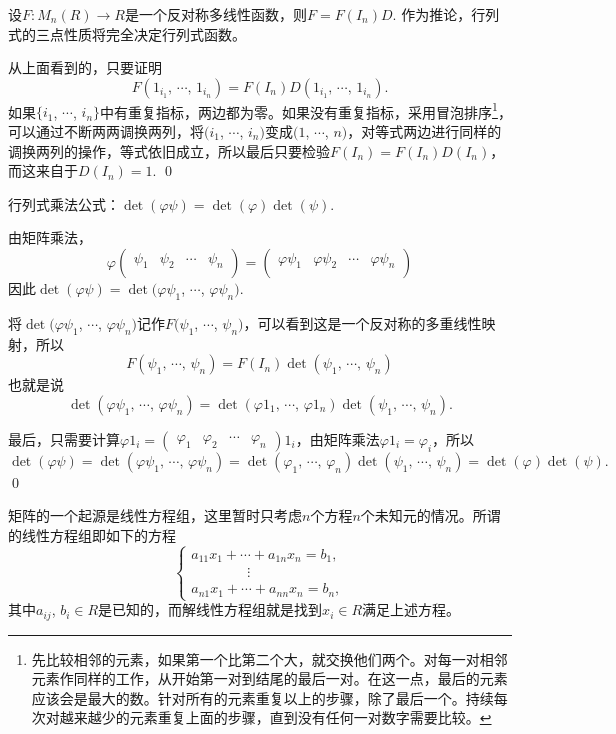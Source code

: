 \pro 设$F:M_n(R)\to R$是一个反对称多线性函数，则$F=F(I_n)D$. 作为推论，行列式的三点性质将完全决定行列式函数。

\proof 
	从上面看到的，只要证明
	\[
		F(1_{i_1},\,\cdots\!,\,1_{i_n})=F(I_n)D(1_{i_1},\,\cdots\!,\,1_{i_n}).
	\]
	如果$\{i_1$, $\cdots$, $i_n\}$中有重复指标，两边都为零。如果没有重复指标，采用冒泡排序\footnote{先比较相邻的元素，如果第一个比第二个大，就交换他们两个。对每一对相邻元素作同样的工作，从开始第一对到结尾的最后一对。在这一点，最后的元素应该会是最大的数。针对所有的元素重复以上的步骤，除了最后一个。持续每次对越来越少的元素重复上面的步骤，直到没有任何一对数字需要比较。}，可以通过不断两两调换两列，将$(i_1$, $\cdots$, $i_n)$变成$(1$, $\cdots$, $n)$，对等式两边进行同样的调换两列的操作，等式依旧成立，所以最后只要检验$F(I_n)=F(I_n)D(I_n)$，而这来自于$D(I_n)=1$.
\qed

\pro 行列式乘法公式：$\det(\varphi \psi)=\det(\varphi)\det(\psi)$.

\proof 
	由矩阵乘法，
	\[
	\varphi
	\begin{pmatrix}
	\psi_{1} & \psi_{2} & \cdots & \psi_{n}\\
	\end{pmatrix}
	=
	\begin{pmatrix}
	\varphi\psi_{1} & \varphi\psi_{2} & \cdots & \varphi\psi_{n}\\
	\end{pmatrix}
	\]
	因此$\det (\varphi \psi)=\det (\varphi\psi_{1}$, $\cdots$, $\varphi\psi_{n})$.

	将$\det(\varphi\psi_{1}$, $\cdots$, $\varphi\psi_{n})$记作$F(\psi_{1}$, $\cdots$, $\psi_{n})$，可以看到这是一个反对称的多重线性映射，所以
	\[
	F(\psi_{1},\,\cdots\!,\,\psi_{n})=F(I_n)\det (\psi_{1},\,\cdots\!,\,\psi_{n})
	\]
	也就是说
	\[
	\det (\varphi\psi_{1},\,\cdots\!,\,\varphi\psi_{n})=\det(\varphi 1_1,\,\cdots\!,\,\varphi 1_n)\det(\psi_{1},\,\cdots\!,\,\psi_{n}).
	\]

	最后，只需要计算$\varphi 1_i=\begin{pmatrix}\varphi_{1} & \varphi_{2} & \cdots & \varphi_{n}\end{pmatrix}1_i$，由矩阵乘法$\varphi 1_i=\varphi_i$，所以
	\[
	\det(\varphi\psi)=\det(\varphi\psi_{1},\,\cdots\!,\,\varphi\psi_{n})=\det(\varphi_1,\,\cdots\!,\,\varphi_n)\det(\psi_{1},\,\cdots\!,\,\psi_{n})=\det(\varphi)\det(\psi).
	\]
\qed

\para 矩阵的一个起源是线性方程组，这里暂时只考虑$n$个方程$n$个未知元的情况。所谓的线性方程组即如下的方程
\[
	\begin{cases}
	a_{11}x_1+\cdots+a_{1n}x_n=b_1,\\
	\qquad\qquad\vdots\\
	a_{n1}x_1+\cdots+a_{nn}x_n=b_n,
	\end{cases}
\]
其中$a_{ij}$, $b_i\in R$是已知的，而解线性方程组就是找到$x_i\in R$满足上述方程。

